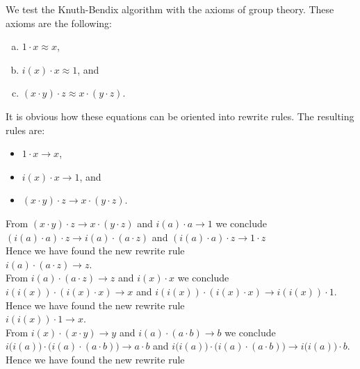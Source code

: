 \example
We test the Knuth-Bendix algorithm with the axioms of group theory.  These axioms are the following:
\begin{enumerate}[(a)]
\item $1 \cdot x \approx x$,
\item $i(x) \cdot x \approx 1$, and
\item $(x \cdot y) \cdot z \approx x \cdot (y \cdot z)$.
\end{enumerate}
It is obvious how these equations can be oriented into rewrite rules.  The resulting rules are:
\begin{itemize}
\item $1 \cdot x \rightarrow x$,
\item $i(x) \cdot x \rightarrow 1$, and
\item $(x \cdot y) \cdot z \rightarrow x \cdot (y \cdot z)$.
\end{itemize}
From $(x \cdot y) \cdot z \rightarrow x \cdot (y \cdot z)$ and  $i(a) \cdot a \rightarrow 1$ we conclude
\\[0.2cm]
\hspace*{1.3cm}
$(i(a) \cdot a) \cdot z \rightarrow i(a) \cdot (a \cdot z)$ \quad and \quad
$(i(a) \cdot a) \cdot z \rightarrow 1 \cdot z$
\\[0.2cm]
Hence we have found the new rewrite rule
\\[0.2cm]
\hspace*{1.3cm}
$i(a) \cdot (a \cdot z) \rightarrow z$.
\\[0.2cm]
From $i(a) \cdot (a \cdot z) \rightarrow z$ and $i(x) \cdot x$ we conclude
\\[0.2cm]
\hspace*{1.3cm}
$i(i(x)) \cdot (i(x) \cdot x) \rightarrow x$ \quad and \quad
$i(i(x)) \cdot (i(x) \cdot x) \rightarrow i(i(x)) \cdot 1$. 
\\[0.2cm]
Hence we have found the new rewrite rule
\\[0.2cm]
\hspace*{1.3cm}
$i(i(x)) \cdot 1 \rightarrow x$.
\\[0.2cm]
From $i(x) \cdot (x \cdot y) \rightarrow y$ and $i(a) \cdot (a \cdot b) \rightarrow b$ we conclude
\\[0.2cm]
\hspace*{1.3cm}
$i\bigl(i(a)\bigr) \cdot \bigl(i(a) \cdot (a \cdot b)\bigr) \rightarrow a \cdot b $ \quad and \quad
$i\bigl(i(a)\bigr) \cdot \bigl(i(a) \cdot (a \cdot b)\bigr) \rightarrow i\bigl(i(a)\bigr) \cdot b$.
\\[0.2cm]
Hence we have found the new rewrite rule
